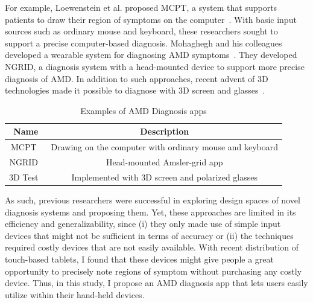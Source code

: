 For example, Loewenstein et al. proposed MCPT, a system that supports patients to draw their region of symptoms on the computer~\cite{loewenstein2003replacing}. With basic input sources such as ordinary mouse and keyboard, these researchers sought to support a precise computer-based diagnosis. Mohaghegh and his colleagues developed a wearable system for diagnosing AMD symptoms~\cite{mohaghegh2016wearable}. They developed NGRID, a diagnosis system with a head-mounted device to support more precise diagnosis of AMD. In addition to such approaches, recent advent of 3D technologies made it possible to diagnose with 3D screen and glasses~\cite{kim2020novel}.

\begin{table}[htbp]
	\begin{center}
		\begin{tabular}{|c|c|} \hline
			Name & Description\\ \hline
			\hline {\sc MCPT~\cite{loewenstein2003replacing}} & Drawing on the computer with ordinary mouse and keyboard\\
			\hline {\sc NGRID~\cite{mohaghegh2016wearable}} & Head-mounted Amsler-grid app\\
			\hline {\sc 3D Test~\cite{kim2020novel}} & Implemented with 3D screen and polarized glasses\\
			\hline
		\end{tabular}
		\caption{Examples of AMD Diagnosis apps}
		\label{tab1}
	\end{center}
\end{table}

As such, previous researchers were successful in exploring design spaces of novel diagnosis systems and proposing them. Yet, these approaches are limited in its efficiency and generalizability, since (i) they only made use of simple input devices that might not be sufficient in terms of accuracy or (ii) the techniques required costly devices that are not easily available. With recent distribution of touch-based tablets, I found that these devices might give people a great opportunity to precisely note regions of symptom without purchasing any costly device. Thus, in this study, I propose an AMD diagnosis app that lets users easily utilize within their hand-held devices.